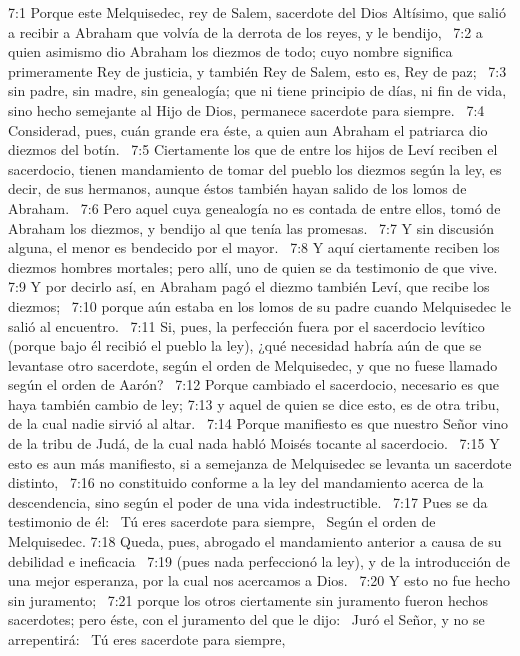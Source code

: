 7:1 Porque este Melquisedec, rey de Salem, sacerdote del Dios Altísimo, que salió a recibir a Abraham que volvía de la derrota de los reyes, y le bendijo,  
7:2 a quien asimismo dio Abraham los diezmos de todo; cuyo nombre significa primeramente Rey de justicia, y también Rey de Salem, esto es, Rey de paz;  
7:3 sin padre, sin madre, sin genealogía; que ni tiene principio de días, ni fin de vida, sino hecho semejante al Hijo de Dios, permanece sacerdote para siempre.  
7:4 Considerad, pues, cuán grande era éste, a quien aun Abraham el patriarca dio diezmos del botín.  
7:5 Ciertamente los que de entre los hijos de Leví reciben el sacerdocio, tienen mandamiento de tomar del pueblo los diezmos según la ley, es decir, de sus hermanos, aunque éstos también hayan salido de los lomos de Abraham.  
7:6 Pero aquel cuya genealogía no es contada de entre ellos, tomó de Abraham los diezmos, y bendijo al que tenía las promesas.  
7:7 Y sin discusión alguna, el menor es bendecido por el mayor.  
7:8 Y aquí ciertamente reciben los diezmos hombres mortales; pero allí, uno de quien se da testimonio de que vive.  
7:9 Y por decirlo así, en Abraham pagó el diezmo también Leví, que recibe los diezmos;  
7:10 porque aún estaba en los lomos de su padre cuando Melquisedec le salió al encuentro.  
7:11 Si, pues, la perfección fuera por el sacerdocio levítico (porque bajo él recibió el pueblo la ley), ¿qué necesidad habría aún de que se levantase otro sacerdote, según el orden de Melquisedec, y que no fuese llamado según el orden de Aarón?  
7:12 Porque cambiado el sacerdocio, necesario es que haya también cambio de ley; 
7:13 y aquel de quien se dice esto, es de otra tribu, de la cual nadie sirvió al altar.  
7:14 Porque manifiesto es que nuestro Señor vino de la tribu de Judá, de la cual nada habló Moisés tocante al sacerdocio.  
7:15 Y esto es aun más manifiesto, si a semejanza de Melquisedec se levanta un sacerdote distinto,  
7:16 no constituido conforme a la ley del mandamiento acerca de la descendencia, sino según el poder de una vida indestructible.  
7:17 Pues se da testimonio de él:  
Tú eres sacerdote para siempre,  
Según el orden de Melquisedec. 
7:18 Queda, pues, abrogado el mandamiento anterior a causa de su debilidad e ineficacia  
7:19 (pues nada perfeccionó la ley), y de la introducción de una mejor esperanza, por la cual nos acercamos a Dios.  
7:20 Y esto no fue hecho sin juramento;  
7:21 porque los otros ciertamente sin juramento fueron hechos sacerdotes; pero éste, con el juramento del que le dijo:  
Juró el Señor, y no se arrepentirá:  
Tú eres sacerdote para siempre,  
